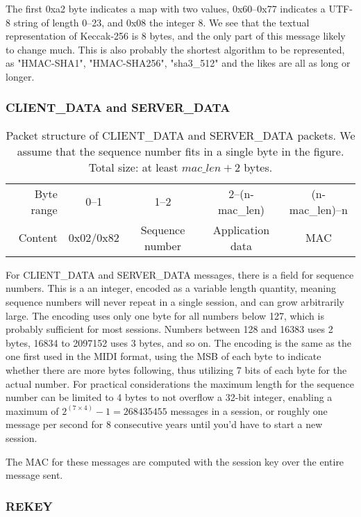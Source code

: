 The first 0xa2 byte indicates a map with two values, 0x60--0x77 indicates a UTF-8 string of length 0--23, and 0x08 the integer 8. We see that the textual representation of Keccak-256 is 8 bytes, and the only part of this message likely to change much. This is also probably the shortest algorithm to be represented, as "HMAC-SHA1", "HMAC-SHA256", "sha3\_512" and the likes are all as long or longer.


        \subsubsection{CLIENT\_DATA and SERVER\_DATA}

\begin{table}[ht!]
\centering
    \begin{tabular}{r | c | c | c | c |}
    \cline{2-5}
    Byte range & 0--1 & 1--2 & 2--(n-mac\_len) & (n-mac\_len)--n \\ \cline{2-5}
    Content & 0x02/0x82 & Sequence number & Application data & MAC \\ \cline{2-5}
    \end{tabular}
    \caption{Packet structure of CLIENT\_DATA and SERVER\_DATA packets. We assume that the sequence number fits in a single byte in the figure. Total size: at least \( mac\_len+2 \) bytes.}
\end{table}

For CLIENT\_DATA and SERVER\_DATA messages, there is a field for sequence numbers. This is a an integer, encoded as a variable length quantity, meaning sequence numbers will never repeat in a single session, and can grow arbitrarily large. The encoding uses only one byte for all numbers below 127, which is probably sufficient for most sessions. Numbers between 128 and 16383 uses 2 bytes, 16834 to 2097152 uses 3 bytes, and so on. The encoding is the same as the one first used in the MIDI format, using the MSB of each byte to indicate whether there are more bytes following, thus utilizing 7 bits of each byte for the actual number. For practical considerations the maximum length for the sequence number can be limited to 4 bytes to not overflow a 32-bit integer, enabling a maximum of \( 2^{(7 \times 4)} - 1 = 268 435 455 \) messages in a session, or roughly one message per second for 8 consecutive years until you'd have to start a new session.

The MAC for these messages are computed with the session key over the entire message sent.


        \subsubsection{REKEY}

